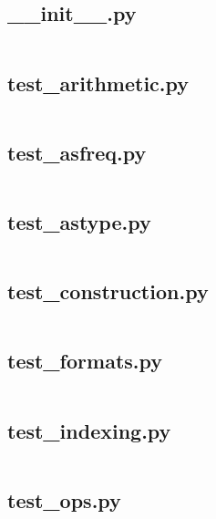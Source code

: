 \documentclass{article}
\begin{document}
\subsection{\_\_init\_\_.py}
\inputminted{python}{/home/dufferzafar/dev/@clones/pandas/pandas/tests/indexes/period/__init__.py}
\newpage

\subsection{test\_arithmetic.py}
\inputminted{python}{/home/dufferzafar/dev/@clones/pandas/pandas/tests/indexes/period/test_arithmetic.py}
\newpage

\subsection{test\_asfreq.py}
\inputminted{python}{/home/dufferzafar/dev/@clones/pandas/pandas/tests/indexes/period/test_asfreq.py}
\newpage

\subsection{test\_astype.py}
\inputminted{python}{/home/dufferzafar/dev/@clones/pandas/pandas/tests/indexes/period/test_astype.py}
\newpage

\subsection{test\_construction.py}
\inputminted{python}{/home/dufferzafar/dev/@clones/pandas/pandas/tests/indexes/period/test_construction.py}
\newpage

\subsection{test\_formats.py}
\inputminted{python}{/home/dufferzafar/dev/@clones/pandas/pandas/tests/indexes/period/test_formats.py}
\newpage

\subsection{test\_indexing.py}
\inputminted{python}{/home/dufferzafar/dev/@clones/pandas/pandas/tests/indexes/period/test_indexing.py}
\newpage

\subsection{test\_ops.py}
\inputminted{python}{/home/dufferzafar/dev/@clones/pandas/pandas/tests/indexes/period/test_ops.py}
\newpage
\end{document}
